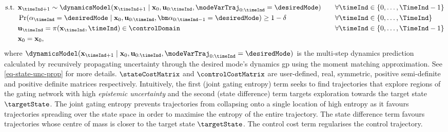 \documentclass{mimosis-class/mimosis}
\numberwithin{equation}{chapter}
\newcommand{\state}{\ensuremath{\mathbf{x}}}
\newcommand{\control}{\ensuremath{\mathbf{u}}}
\newcommand{\modeVar}{\ensuremath{\alpha}}
\begin{document}
{\begin{subequations}
\begin{align}
\text{s.t. } &\state_{\timeInd+1} \sim \dynamicsModel(\state_{\timeInd+1} \mid \state_{0}, \control_{0:\timeInd}, \modeVarTraj_{0:\timeInd}=\desiredMode)
\quad &&\forall \timeInd \in \{0, \ldots, \TimeInd-1\} \\
&\Pr(\modeVar_{\timeInd} = \desiredMode \mid \state_{0}, \control_{0:\timeInd}, \bm\modeVar_{0:\timeInd-1}=\desiredMode)
\geq 1-\delta \quad &&\forall \timeInd \in \{ 0, \ldots, \TimeInd \} \\
&\control_{\timeInd} = \pi(\state_{\timeInd}, \timeInd) \in \controlDomain \quad &&\forall \timeInd \in \{0, \ldots, \TimeInd-1\} \\
&\state_0 = \state_0,
\end{align}
\end{subequations}
where \(\dynamicsModel(\state_{\timeInd+1} \mid \state_{0}, \control_{0:\timeInd}, \modeVarTraj_{0:\timeInd}=\desiredMode)\)
is the multi-step dynamics prediction calculated by recursively propagating uncertainty through the desired
mode's dynamics \acrshort{gp} using the moment matching approximation.
See \cref{eq-state-unc-prop} for more details.
\(\stateCostMatrix\) and \(\controlCostMatrix\) are user-defined, real, symmetric, positive semi-definite and
positive definite matrices respectively.
Intuitively, the first (joint gating entropy) term seeks to find trajectories
that explore regions of the gating network with high \emph{epistemic uncertainty} and the second (state difference) term
targets exploration towards the target state \(\targetState\).
The joint gating entropy prevents trajectories from collapsing onto a single location of high entropy as it favours
trajectories spreading over the state space in order to maximise the entropy of the entire trajectory.
The state difference term favours trajectories whose centre of mass is closer to the target state \(\targetState\).
The control cost term regularises the control trajectory.



}
\end{document}
